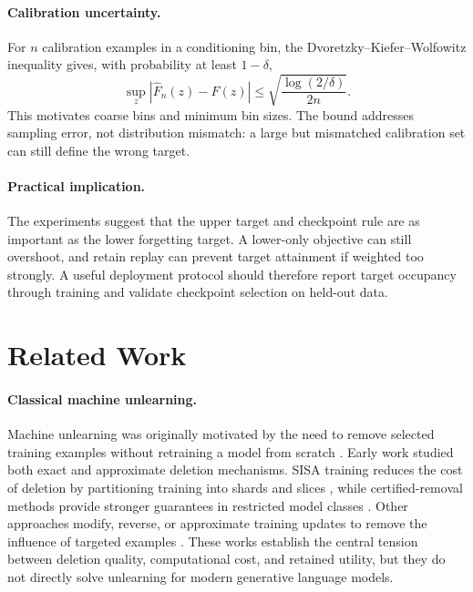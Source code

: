 \documentclass[10pt,twocolumn]{article}
\begin{document}
\paragraph{Calibration uncertainty.}
For $n$ calibration examples in a conditioning bin, the
Dvoretzky--Kiefer--Wolfowitz inequality gives, with probability at least
$1-\delta$,
\begin{equation}
  \sup_z|\widehat F_n(z)-F(z)|
  \leq\sqrt{\frac{\log(2/\delta)}{2n}}.
\end{equation}
This motivates coarse bins and minimum bin sizes. The bound addresses sampling
error, not distribution mismatch: a large but mismatched calibration set can
still define the wrong target.

\paragraph{Practical implication.}
The experiments suggest that the upper target and checkpoint rule are as
important as the lower forgetting target. A lower-only objective can still
overshoot, and retain replay can prevent target attainment if weighted too
strongly. A useful deployment protocol should therefore report target occupancy
through training and validate checkpoint selection on held-out data.

\section{Related Work}

\paragraph{Classical machine unlearning.}
Machine unlearning was originally motivated by the need to remove selected
training examples without retraining a model from scratch \citep{cao2015towards}.
Early work studied both exact and approximate deletion mechanisms. SISA training
reduces the cost of deletion by partitioning training into shards and slices
\citep{bourtoule2021machine}, while certified-removal methods provide stronger
guarantees in restricted model classes \citep{ginart2019making,guo2020certified,
neel2021descent}. Other approaches modify, reverse, or approximate training
updates to remove the influence of targeted examples
\citep{graves2021amnesiac,thudi2022unrolling,izoo2021approximate}. These works
establish the central tension between deletion quality, computational cost, and
retained utility, but they do not directly solve unlearning for modern generative
language models.
\end{document}
